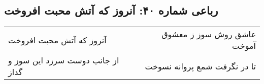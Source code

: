\begin{center}
\section*{رباعی شماره ۴۰: آنروز که آتش محبت افروخت}
\label{sec:sh040}
\begin{longtable}{l p{0.5cm} r}
آنروز که آتش محبت افروخت
&&
عاشق روش سوز ز معشوق آموخت
\\
از جانب دوست سرزد این سوز و گداز
&&
تا در نگرفت شمع پروانه نسوخت
\\
\end{longtable}
\end{center}

